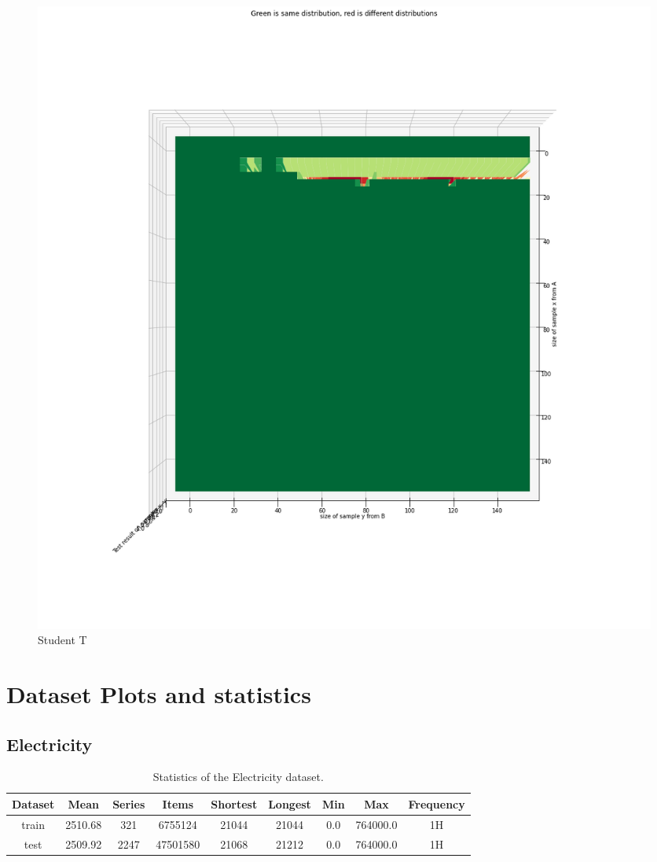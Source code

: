 \clearpage
\begin{figure}[htb]
  \centering
  \includegraphics[width=\linewidth]{./img/hypothesis_test/appendix/ttest_student_t.png}
  \caption{Student T}
\end{figure}
\clearpage
\section{Dataset Plots and statistics}
\label{app:dataset_analysis}
\clearpage
\subsection{Electricity}
\begin{table}[htb]
  \begin{tabular}{||c | c c c c c c c c ||}
    \hline
    Dataset & Mean    & Series & Items    & Shortest & Longest & Min & Max      & Frequency \\ [0.5ex]
    \hline\hline
    train   & 2510.68 & 321    & 6755124  & 21044    & 21044   & 0.0 & 764000.0 & 1H        \\
    \hline
    test    & 2509.92 & 2247   & 47501580 & 21068    & 21212   & 0.0 & 764000.0 & 1H        \\
    \hline
  \end{tabular}
  \caption{Statistics of the Electricity dataset.}
\end{table}

